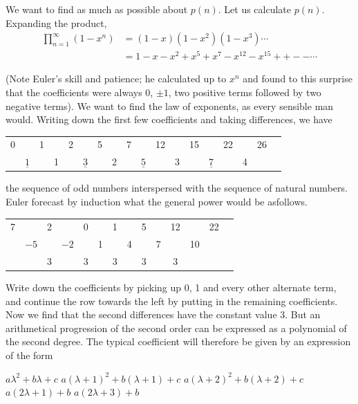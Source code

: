 We want to find as much as possible about $p(n)$. Let us calculate
$p(n)$. Expanding the product,
\begin{align*}
  \prod^\infty_{n=1} (1-x^n) & = (1-x)(1-x^2) (1-x^3)\cdots\\
  & = 1-x-x^2 + x^5+x^7 -x^{12} - x^{15} + + -- \cdots
\end{align*}

(Note Euler's skill and patience; he calculated up to $x^n$ and found
to this surprise that the coefficients were always $0$, $\pm 1$, two
positive terms followed by two negative terms). We want to find the
law of exponents, as every sensible man would. Writing down the first
few coefficients and taking differences, we have 

\medskip
\noindent 
\begin{tabular}{cccccccccccccccccc}
  0 && 1 && 2 && 5 && 7 && 12 && 15 && 22 && 26\\[5pt]
  &$\underline{1}$ && 1 && $\underline{3}$&&2&& $\underline{5}$ && 3&&
  $\underline{7}$ &&4  
\end{tabular}

\medskip 
\noindent 
the sequence of odd numbers interspersed with the sequence of natural
numbers. Euler forecast by induction what the general power would be
as\pageoriginale  follows.

\medskip 
\begin{center}
  \begin{tabular}{cccccccccccccc}
    7&&2&&0&&1&&5&&12&&22&\\[5pt]
    &$-5$&&$-2$&&1&&4&&7&&10&\\[5pt]
    &&3&&3&&3&&3&&3&&&
  \end{tabular}
\end{center}

Write down the coefficients by picking up 0, 1 and every other
alternate term, and continue the row towards the left by putting in
the remaining coefficients. Now we find that the second differences
have the constant value 3. But an arithmetical progression of the
second order can be expressed as a polynomial of the second
degree. The typical coefficient will therefore be given by an
expression of the form
\medskip

    $a \lambda^2 + b\lambda+c$ \qquad  $a(\lambda+1)^2 + b(\lambda+1)+c$
    \qquad $a(\lambda+2)^2 + b(\lambda+2)+c$\\

     \hspace{1.5cm} $a(2 \lambda+1)+b$ \hspace{2cm} $a(2\lambda +3) +
     b$\hspace{4cm}\\  

